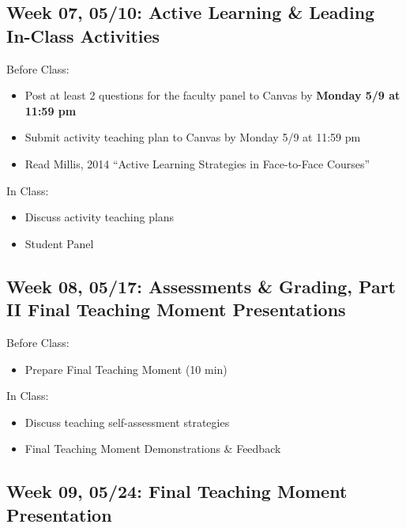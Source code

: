 \documentclass[11pt,]{article}
\providecommand{\tightlist}{%
  \setlength{\itemsep}{0pt}\setlength{\parskip}{0pt}}
\begin{document}
\hypertarget{week-07-0510-active-learning-leading-in-class-activities}{%
\subsection{Week 07, 05/10: Active Learning \& Leading In-Class
Activities}\label{week-07-0510-active-learning-leading-in-class-activities}}

Before Class:

\begin{itemize}
\tightlist
\item
  Post at least 2 questions for the faculty panel to Canvas by
  \textbf{Monday 5/9 at 11:59 pm}
\item
  Submit activity teaching plan to Canvas by Monday 5/9 at 11:59 pm
\item
  Read Millis, 2014 ``Active Learning Strategies in Face-to-Face
  Courses''
\end{itemize}

In Class:

\begin{itemize}
\tightlist
\item
  Discuss activity teaching plans
\item
  Student Panel
\end{itemize}

\hypertarget{week-08-0517-assessments-grading-part-ii-final-teaching-moment-presentations}{%
\subsection{Week 08, 05/17: Assessments \& Grading, Part II
\textbar\textbar{} Final Teaching Moment
Presentations}\label{week-08-0517-assessments-grading-part-ii-final-teaching-moment-presentations}}

Before Class:

\begin{itemize}
\tightlist
\item
  Prepare Final Teaching Moment (10 min)
\end{itemize}

In Class:

\begin{itemize}
\tightlist
\item
  Discuss teaching self-assessment strategies
\item
  Final Teaching Moment Demonstrations \& Feedback
\end{itemize}

\hypertarget{week-09-0524-final-teaching-moment-presentation}{%
\subsection{Week 09, 05/24: Final Teaching Moment
Presentation}\label{week-09-0524-final-teaching-moment-presentation}}
\end{document}
